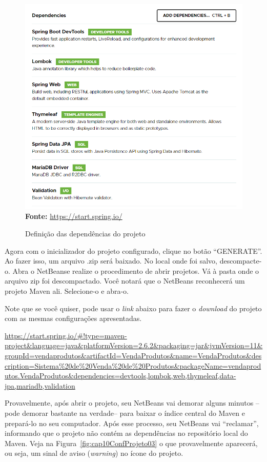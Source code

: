 \FloatBarrier
\begin{figure}[!htbp]
    \centering
    \caption{Definição das dependências do projeto}
    \includegraphics[scale=0.7]{imagens/cap10SpringInitializrConfProjeto02}
    \\\textbf{Fonte:} \url{https://start.spring.io/}
    \label{fig:cap10SpringInitializrConfProjeto02}
\end{figure}
\FloatBarrier

Agora com o inicializador do projeto configurado, clique no botão ``GENERATE''. Ao fazer isso, um arquivo .zip será baixado. No local onde foi salvo, descompacte-o. Abra o NetBeanse realize o procedimento de abrir projetos. Vá à pasta onde o arquivo zip foi descompactado. Você notará que o NetBeans reconhecerá um projeto Maven ali. Selecione-o e abra-o.

Note que se você quiser, pode usar o \textit{link} abaixo para fazer o \textit{download} do projeto com as mesmas configurações apresentadas.

\url{https://start.spring.io/#!type=maven-project&language=java&platformVersion=2.6.2&packaging=jar&jvmVersion=11&groupId=vendaprodutos&artifactId=VendaProdutos&name=VendaProdutos&description=Sistema%20de%20Venda%20de%20Produtos&packageName=vendaprodutos.VendaProdutos&dependencies=devtools,lombok,web,thymeleaf,data-jpa,mariadb,validation}

Provavelmente, após abrir o projeto, seu NetBeans vai demorar alguns minutos --pode demorar bastante na verdade-- para baixar o índice central do Maven e prepará-lo no seu computador. Após esse processo, seu NetBeans vai ``reclamar'', informando que o projeto não contém as dependências no repositório local do Maven. Veja na Figura~\ref{fig:cap10ConfProjeto03} o que provavelmente aparecerá, ou seja, um sinal de aviso (\textit{warning}) no ícone do projeto.

